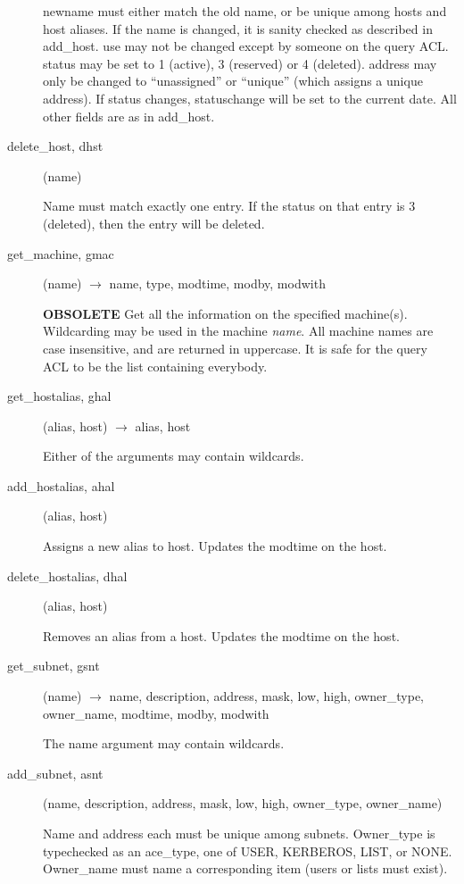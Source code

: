\documentclass{article}
\begin{document}
\begin{description}
newname must either match the old name, or be unique among hosts and
host aliases.  If the name is changed, it is sanity checked as
described in add\_host.  use may not be changed except by someone on
the query ACL.  status may be set to 1 (active), 3 (reserved) or 4
(deleted).  address may only be changed to ``unassigned'' or ``unique''
(which assigns a unique address).  If status changes, statuschange
will be set to the current date.  All other fields are as in add\_host.

\item[delete\_host, dhst](name)

Name must match exactly one entry.  If the status on that entry is 3
(deleted), then the entry will be deleted.

\item[get\_machine, gmac](name) $\rightarrow$ name, type, modtime, modby, modwith

{\bf OBSOLETE} Get all the information on the specified machine(s).
Wildcarding may be used in the machine {\em name}.  All machine names
are case insensitive, and are returned in uppercase.  It is safe for
the query ACL to be the list containing everybody.

\item[get\_hostalias, ghal](alias, host) $\rightarrow$ alias, host

Either of the arguments may contain wildcards.

\item[add\_hostalias, ahal](alias, host)

Assigns a new alias to host.  Updates the modtime on the host.

\item[delete\_hostalias, dhal](alias, host)

Removes an alias from a host.  Updates the modtime on the
host.

\item[get\_subnet, gsnt](name) $\rightarrow$ name, description, address,
mask, low, high, owner\_type, owner\_name, modtime, modby, modwith

The name argument may contain wildcards.

\item[add\_subnet, asnt](name, description, address, mask, low, high, owner\_type,
owner\_name)

Name and address each must be unique among subnets.  Owner\_type
is typechecked as an ace\_type, one of USER, KERBEROS, LIST, or NONE.
Owner\_name must name a corresponding item (users or lists must exist).


\end{description}
\end{document}
